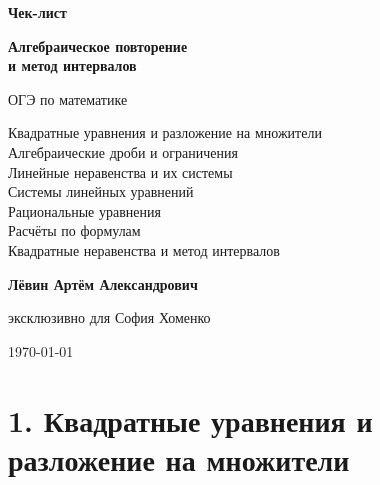 \documentclass[a4paper,12pt]{article}
\newcommand{\student}{София Хоменко}
\newcommand{\teacher}{Лёвин Артём Александрович}
\begin{document}
\thispagestyle{empty}

\begin{center}
\vspace*{20mm}

{\color{darkaccent}\Large\bfseries Чек-лист}

\vspace{6mm}

{\Huge\bfseries
Алгебраическое повторение\\[2mm]
и метод интервалов}

\vspace{8mm}

{\Large ОГЭ по математике}

\vspace{13mm}

{\large
Квадратные уравнения и разложение на множители\\
Алгебраические дроби и ограничения\\
Линейные неравенства и их системы\\
Системы линейных уравнений\\
Рациональные уравнения\\
Расчёты по формулам\\
Квадратные неравенства и метод интервалов}

\vfill

{\large\bfseries \teacher}

\vspace{2mm}

{\large эксклюзивно для \student}

\vspace{4mm}

{\large \today}

\vfill


\vspace{5mm}
\end{center}

\clearpage

\section{1. Квадратные уравнения и разложение на множители}
\end{document}
